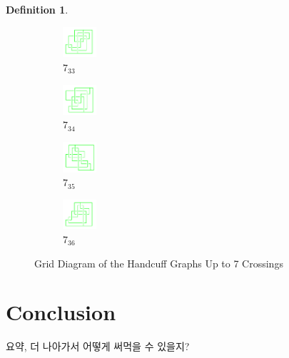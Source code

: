 \documentclass{article}
\theoremstyle{definition}
\newtheorem{defn}[thm]{Definition}
\theoremstyle{theorem}
\theoremstyle{proposition}
\theoremstyle{corollary}
\begin{document}
\begin{defn}
\begin{figure}[H]
\begin{subfigure}{0.075\textwidth}
    \includegraphics[width=1.25cm]{../Midterm_Poster/grid_diagram/handcuff_7_33.png}
    \caption{$7_{33}$} 
    \end{subfigure}
    \begin{subfigure}{0.075\textwidth}
    \includegraphics[width=1.25cm]{../Midterm_Poster/grid_diagram/handcuff_7_34.png}
    \caption{$7_{34}$} 
    \end{subfigure}
    \begin{subfigure}{0.075\textwidth}
    \includegraphics[width=1.25cm]{../Midterm_Poster/grid_diagram/handcuff_7_35.png}
    \caption{$7_{35}$} 
    \end{subfigure}
    \begin{subfigure}{0.075\textwidth}
    \includegraphics[width=1.25cm]{../Midterm_Poster/grid_diagram/handcuff_7_36.png}
    \caption{$7_{36}$} 
    \end{subfigure}
    \caption{Grid Diagram of the Handcuff Graphs Up to 7 Crossings}
  \end{figure}


\section{Conclusion}
요약, 더 나아가서 어떻게 써먹을 수 있을지?


\end{defn}
\end{document}

